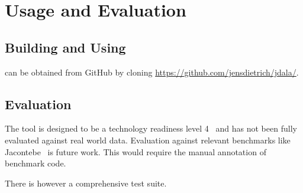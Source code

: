 \section{Usage and Evaluation}
\label{sec:useandevaluate}	


\subsection{Building and Using \jdala}

\jdala can be obtained from GitHub by cloning \url{https://github.com/jensdietrich/jdala/}.



\subsection{Evaluation}


The tool is designed to be a technology readiness level 4~\cite{mankins1995technology} and has not been fully evaluated against real world data. Evaluation against relevant  benchmarks like Jacontebe~\cite{lin2015jacontebe} is future work. This would require the manual annotation of benchmark code. 

There is however a comprehensive test suite.  


